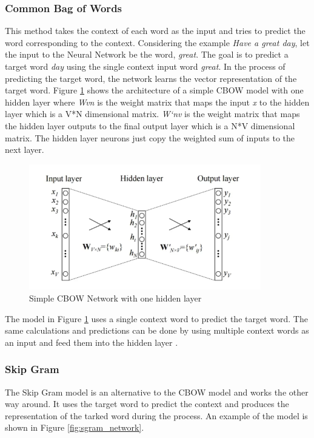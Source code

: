 \subsubsection{Common Bag of Words}
This method takes the context of each word as the input and tries to predict the word corresponding to the context. Considering the example \textit{Have a great day}, let the input to the Neural Network be the word, \textit{great}. The goal is to predict a target word \textit{day} using the single context input word \textit{great}. In the process of predicting the target word, the network learns the vector representation of the target word. Figure \ref{fig:cbow_network} shows the architecture of a simple CBOW model with one hidden layer where \textit{Wvn} is the weight matrix that maps the input \textit{x} to the hidden layer which is a V*N dimensional matrix. \textit{W`nv} is the weight matrix that maps the hidden layer outputs to the final output layer which is a N*V dimensional matrix. The hidden layer neurons just copy the weighted sum of inputs to the next layer.

\begin{figure}[H]
	\centering
	\includegraphics[width=0.9\textwidth]{figures/cbow_network.png}
	\caption{Simple CBOW Network with one hidden layer}
	\label{fig:cbow_network}
\end{figure}

The model in Figure \ref{fig:cbow_network} uses a single context word to predict the target word. The same calculations and predictions can be done by using multiple context words as an input and feed them into the hidden layer \cite{word2vec}.

\subsubsection{Skip Gram}
The Skip Gram model is an alternative to the CBOW model and works the other way around. It uses the target word to predict the context and produces the representation of the tarked word during the process. An example of the model is shown in Figure \ref{fig:sgram_network}.

